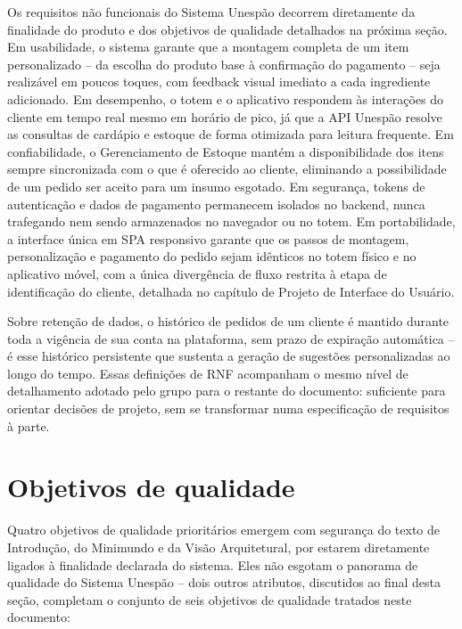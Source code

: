 \documentclass[a4paper,12pt,oneside,openany]{book}
\begin{document}
Os requisitos não funcionais do Sistema Unespão decorrem diretamente da finalidade do produto e dos objetivos de qualidade detalhados na próxima seção. Em usabilidade, o sistema garante que a montagem completa de um item personalizado -- da escolha do produto base à confirmação do pagamento -- seja realizável em poucos toques, com feedback visual imediato a cada ingrediente adicionado. Em desempenho, o totem e o aplicativo respondem às interações do cliente em tempo real mesmo em horário de pico, já que a API Unespão resolve as consultas de cardápio e estoque de forma otimizada para leitura frequente. Em confiabilidade, o Gerenciamento de Estoque mantém a disponibilidade dos itens sempre sincronizada com o que é oferecido ao cliente, eliminando a possibilidade de um pedido ser aceito para um insumo esgotado. Em segurança, tokens de autenticação e dados de pagamento permanecem isolados no backend, nunca trafegando nem sendo armazenados no navegador ou no totem. Em portabilidade, a interface única em SPA responsivo garante que os passos de montagem, personalização e pagamento do pedido sejam idênticos no totem físico e no aplicativo móvel, com a única divergência de fluxo restrita à etapa de identificação do cliente, detalhada no capítulo de Projeto de Interface do Usuário.

Sobre retenção de dados, o histórico de pedidos de um cliente é mantido durante toda a vigência de sua conta na plataforma, sem prazo de expiração automática -- é esse histórico persistente que sustenta a geração de sugestões personalizadas ao longo do tempo. Essas definições de RNF acompanham o mesmo nível de detalhamento adotado pelo grupo para o restante do documento: suficiente para orientar decisões de projeto, sem se transformar numa especificação de requisitos à parte.

\section{Objetivos de qualidade}\label{sec:quality-goals}

Quatro objetivos de qualidade prioritários emergem com segurança do texto de Introdução, do Minimundo e da Visão Arquitetural, por estarem diretamente ligados à finalidade declarada do sistema. Eles não esgotam o panorama de qualidade do Sistema Unespão -- dois outros atributos, discutidos ao final desta seção, completam o conjunto de seis objetivos de qualidade tratados neste documento:
\end{document}
